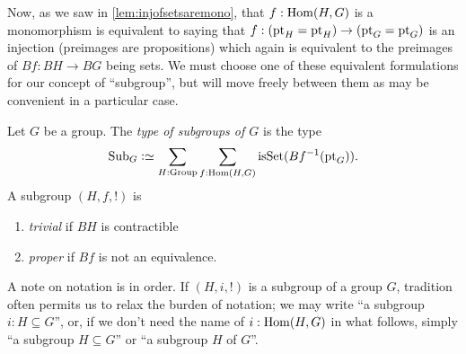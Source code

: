 Now, as we saw in \cref{lem:injofsetsaremono}, that   $f:\Hom(H,G)$ is a monomorphism is equivalent to saying that $f:(\mathrm{pt}_H=\mathrm{pt}_H)\to(\mathrm{pt}_G=\mathrm{pt}_G)$ is an injection (preimages are propositions) which again is equivalent to the preimages of $Bf:BH\to BG$ being sets.
We must choose one of these equivalent formulations for our concept of ``subgroup'', but will move freely between them as may be convenient in a particular case.
    \begin{definition}
      \label{def:subgroup}
      Let $G$ be a group.  
      The \emph{type of subgroups of $G$} is the type
      $$\typesubgroup_G\defequi\sum_{H:\typegroup}\sum_{f:\Hom(H,G)}\isset(Bf^{-1}(\pt_G)).$$
       A subgroup $(H,f,!)$ is
      \begin{enumerate}
      \item \emph{trivial} if $BH$ is contractible
      \item \emph{proper} if $Bf$ is not an equivalence.
      \end{enumerate}
    \end{definition}
    \begin{remark}
      \label{rem:notationsubgroup}
      A note on notation is in order.  
If $(H,i,!)$ is a subgroup of a group $G$, tradition often permits us to relax the burden of notation; we may write ``a subgroup $i:H\subseteq G$'', or, if we don't need the name of $i:\Hom(H,G)$ in what follows, simply ``a subgroup $H\subseteq G$'' or ``a subgroup $H$ of $G$''.
    \end{remark}

